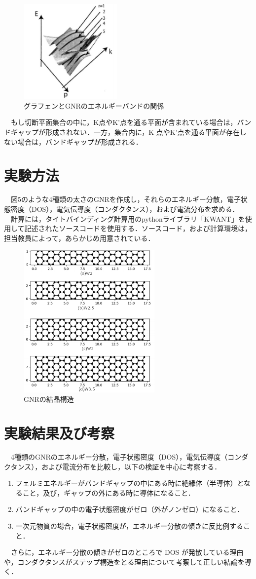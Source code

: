 \begin{figure}[H]
  \centering
  \includegraphics[width=5cm]{./imgs/4.png}
  \caption{グラフェンとGNRのエネルギーバンドの関係}
\end{figure}

　もし切断平面集合の中に，K点やK’点を通る平面が含まれている場合は，バンドギャップが形成されない．一方，集合内に，K 点やK’点を通る平面が存在しない場合は，バンドギャップが形成される．

\section{実験方法}
　図5のような4種類の太さのGNRを作成し，それらのエネルギー分散，電子状態密度（DOS），電気伝導度（コンダクタンス），および電流分布を求める．\\
　計算には，タイトバインディング計算用のpythonライブラリ「KWANT」を使用して記述されたソースコードを使用する．ソースコード，および計算環境は，担当教員によって，あらかじめ用意されている．
\begin{figure}[H]
  \centering
  \includegraphics[width=7cm]{./imgs/5.png}
  \caption{GNRの結晶構造}
\end{figure}

\section{実験結果及び考察}
　4種類のGNRのエネルギー分散，電子状態密度（DOS），電気伝導度（コンダクタンス），および電流分布を比較し，以下の検証を中心に考察する．
\begin{enumerate}
  \item フェルミエネルギーがバンドギャップの中にある時に絶縁体（半導体）となること，及び，ギャップの外にある時に導体になること．
  \item バンドギャップの中の電子状態密度がゼロ（外がノンゼロ）になること．
  \item 一次元物質の場合，電子状態密度が，エネルギー分散の傾きに反比例すること．
\end{enumerate}

　さらに，エネルギー分散の傾きがゼロのところで DOS が発散している理由や，コンダクタンスがステップ構造をとる理由について考察して正しい結論を導く．


